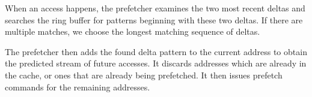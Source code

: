 When an access happens, the prefetcher examines the two most recent deltas and
searches the ring buffer for patterns beginning with these two deltas. If there
are multiple matches, we choose the longest matching sequence of deltas.

The prefetcher then adds the found delta pattern to the current address to
obtain the predicted stream of future accesses. It discards addresses which
are already in the cache, or ones that are already being prefetched. It then
issues prefetch commands for the remaining addresses.

